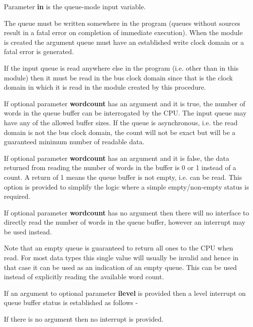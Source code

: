             Parameter {\bf in} is the queue-mode input variable.
            
            The queue must be written somewhere in the program (queues without
            sources result in a fatal error on completion of immediate
            execution). When the module is created the argument queue must have
            an established write clock domain or a fatal error is generated.

            If the input queue is read anywhere else in the program (i.e. other
            than in this module) then it must be read in the bus clock domain
            since that is the clock domain in which it is read in the module
            created by this procedure.

            If optional parameter {\bf wordcount} has an argument and it
            is true, the number of words in the queue buffer can be interrogated
            by the CPU. The input queue may have any of the allowed buffer sizes.
            If the queue is asynchronous, i.e. the read domain is not the bus
            clock domain, the count will not be exact but will be a guaranteed
            minimum number of readable data.

            If optional parameter {\bf wordcount} has an argument and it
            is false, the data returned from reading the number of words in the
            buffer is 0 or 1 instead of a count. A return of 1 means the queue
            buffer is not empty, i.e. can be read. This option is provided to
            simplify the logic where a simple empty/non-empty status is required.

            If optional parameter {\bf wordcount} has no argument then
            there will no interface to directly read the number of words in the
            queue buffer, however an interrupt may be used instead.            

            Note that an empty queue is guaranteed to return all ones to the CPU
            when read. For most data types this single value will usually be
            invalid and hence in that case it can be used as an indication of an
            empty queue. This can be used instead of explicitly reading the
            available word count.

            If an argument to optional parameter {\bf ilevel} is provided then a
            level interrupt on queue buffer status is established as follows -

            If there is no argument then no interrupt is provided.

